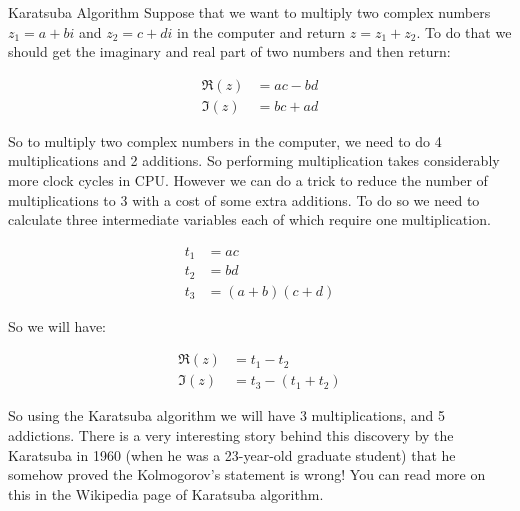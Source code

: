 \begin{example}{Karatsuba Algorithm}
	Suppose that we want to multiply two complex numbers $z_1 = a + bi$ and $ z_2 = c + di$ in the computer and return $z = z_1 + z_2$. To do that we should get the imaginary and real part of two numbers and then return:
	
	\begin{align*}
		\Re (z) &= ac - bd \\
		\Im (z) &= bc + ad
	\end{align*}
	
	So to multiply two complex numbers in the computer, we need to do 4 multiplications and 2 additions. So performing multiplication takes considerably more clock cycles in CPU. However we can do a trick to reduce the number of multiplications to 3 with a cost of some extra additions. To do so we need to calculate three intermediate variables each of which require one multiplication.
	
	\begin{align*}
		t_1 &= ac \\
		t_2 &= bd \\
		t_3 &= (a+b)(c+d)
	\end{align*}
	
	So we will have:
	
	\begin{align*}
		\Re (z) &= t_1 - t_2 \\
		\Im (z) &= t_3 - (t_1 + t_2)
	\end{align*}
	
	So using the Karatsuba algorithm we will have 3 multiplications, and 5 addictions. There is a very interesting story behind this discovery by the Karatsuba in 1960 (when he was a 23-year-old graduate student) that he somehow proved the Kolmogorov's statement is wrong! You can read more on this in the Wikipedia page of Karatsuba algorithm.   
\end{example}

